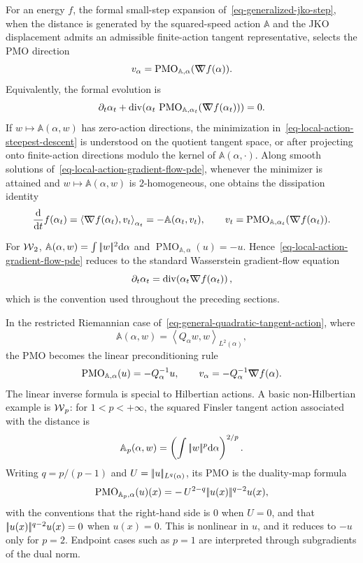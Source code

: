 For an energy $f$, the formal small-step expansion of~\eqref{eq-generalized-jko-step}, when the distance is generated by the squared-speed action \(\mathbb A\) and the JKO displacement admits an admissible finite-action tangent representative, selects the PMO direction
\begin{equation}\label{eq-generalized-gradient-from-action}
	v_{\alpha}
	=
	\operatorname{PMO}_{\mathbb A,\alpha}(\mathord{\nabla\mkern-9.3mu\nabla} f(\alpha)).
\end{equation}
Equivalently, the formal evolution is
\begin{equation}\label{eq-local-action-gradient-flow-pde}
	\partial_t\alpha_t
	+
	\operatorname{div}\!\left(
	\alpha_t\,\operatorname{PMO}_{\mathbb A,\alpha_t}(\mathord{\nabla\mkern-9.3mu\nabla} f(\alpha_t))
	\right)=0.
\end{equation}
If \(w\mapsto\mathbb A(\alpha,w)\) has zero-action directions, the minimization in~\eqref{eq-local-action-steepest-descent} is understood on the quotient tangent space, or after projecting onto finite-action directions modulo the kernel of \(\mathbb A(\alpha,\cdot)\). Along smooth solutions of~\eqref{eq-local-action-gradient-flow-pde}, whenever the minimizer is attained and \(w\mapsto\mathbb A(\alpha,w)\) is \(2\)-homogeneous, one obtains the dissipation identity
\[
	\frac{\mathrm{d}}{\mathrm{d} t}f(\alpha_t)
	=
	\left\langle \mathord{\nabla\mkern-9.3mu\nabla} f(\alpha_t),v_t\right\rangle_{\alpha_t}
	=
	-\mathbb A(\alpha_t,v_t),
	\qquad
	v_t=\operatorname{PMO}_{\mathbb A,\alpha_t}(\mathord{\nabla\mkern-9.3mu\nabla} f(\alpha_t)).
\]

For \(\operatorname{\mathcal{W}}_2\), \(\mathbb A(\alpha,w)=\int|\!| w |\!|^2\mathrm{d}\alpha\) and \(\operatorname{PMO}_{\mathbb A,\alpha}(u)=-u\). Hence~\eqref{eq-local-action-gradient-flow-pde} reduces to the standard Wasserstein gradient-flow equation
\[
	\partial_t\alpha_t
	=
	\operatorname{div}\!\left(\alpha_t\mathord{\nabla\mkern-9.3mu\nabla} f(\alpha_t)\right),
\]
which is the convention used throughout the preceding sections.

In the restricted Riemannian case of~\eqref{eq-general-quadratic-tangent-action}, where
\[
	\mathbb A(\alpha,w)=\left\langle Q_\alpha w,w\right\rangle_{L^2(\alpha)},
\]
the PMO becomes the linear preconditioning rule
\begin{equation}\label{eq-generalized-gradient-q-preconditioner}
	\operatorname{PMO}_{\mathbb A,\alpha}(u)
	=
	-Q_\alpha^{-1}u,
	\qquad
	v_\alpha=-Q_\alpha^{-1}\mathord{\nabla\mkern-9.3mu\nabla} f(\alpha).
\end{equation}
The linear inverse formula is special to Hilbertian actions. A basic non-Hilbertian example is \(\operatorname{\mathcal{W}}_p\): for \(1<p<+\infty\), the squared Finsler tangent action associated with the distance is
\[
	\mathbb A_p(\alpha,w)=\left(\int|\!| w |\!|^p\mathrm{d}\alpha\right)^{2/p}.
\]
Writing \(q=p/(p-1)\) and \(U=|\!| u |\!|_{L^q(\alpha)}\), its PMO is the duality-map formula
\begin{equation}\label{eq-wp-pmo}
	\operatorname{PMO}_{\mathbb A_p,\alpha}(u)(x)
	=
	-\,U^{2-q}|\!| u(x) |\!|^{q-2}u(x),
\end{equation}
with the conventions that the right-hand side is \(0\) when \(U=0\), and that \(|\!| u(x) |\!|^{q-2}u(x)=0\) when \(u(x)=0\). This is nonlinear in \(u\), and it reduces to \(-u\) only for \(p=2\). Endpoint cases such as \(p=1\) are interpreted through subgradients of the dual norm.

